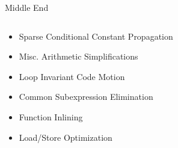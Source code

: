 \documentclass[en,16:9]{sdqbeamer}
\begin{document}
\begin{frame}{Middle End}
	\begin{columns}
		\begin{column}{0.4\linewidth}
			\begin{itemize}
				\item Sparse Conditional Constant Propagation
				\item Misc. Arithmetic Simplifications
				\item Loop Invariant Code Motion
				\item Common Subexpression Elimination
				\item Function Inlining
				\item Load/Store Optimization
			\end{itemize}%
		\end{column}


\end{columns}
\end{frame}
\end{document}
